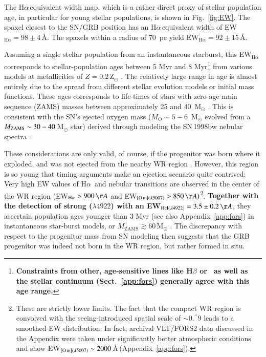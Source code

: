 \documentclass[traditabstract, referee]{aa}
\newcommand{\farc}{\hbox{$.\!\!^{\prime\prime}$}}
\newcommand{\ha}{H$\alpha$}
\newcommand{\hei}{\ion{He}{i}}
\newcommand{\oiii}{[\ion{O}{iii}]}
\begin{document}
The \ha\,equivalent width map, which is a rather direct proxy of stellar population age, in particular for young stellar populations, is shown in Fig.~\ref{fig:EW}. The spaxel closest to the SN/GRB position has an \ha\,equivalent width of EW$_{\mathrm{H\alpha}}=98\pm4$\,\AA. The spaxels within a radius of 70~pc yield EW$_{\mathrm{H\alpha}}=92\pm15$\,\AA. 

Assuming a single stellar population from an instantaneous starburst, this EW$_{\mathrm{H\alpha}}$ corresponds to stellar-population ages between 5 Myr and 8 Myr\footnote{\textbf{Constraints from other, age-sensitive lines like H$\beta$ or \hei\,\citep{1999ApJS..125..489G} as well as the stellar continuum (Sect.~\ref{app:fors}) generally agree with this age range.}} from various models at metallicities of $Z=0.2$\,Z$_{\odot}$ \citep[see e.g.][and references therein]{2013ApJ...779..170L, 2016arXiv160703446K}. The relatively large range in age is almost entirely due to the spread from different stellar evolution models or initial mass functions. These ages corresponds to life-times of stars with zero-age main sequence (ZAMS) masses between approximately 25 and 40~M$_{\odot}$ \citep{1994A&AS..105...29F, 2005A&A...429..581M}. This is consistent with the SN's ejected oxygen mass ($M_{\mathrm{O}}\sim5-6$~M$_{\odot}$ evolved from a $M_{\rm{ZAMS}} \sim 30-40$\,M$_{\odot}$ star) derived through modeling the SN\,1998bw nebular spectra \citep{2001ApJ...559.1047M, 2006ApJ...640..854M}.

These considerations are only valid, of course, if the progenitor was born where it exploded, and was not ejected from the nearby WR region \citep{2006A&A...454..103H}. However, this region is so young that timing arguments make an ejection scenario quite contrived: Very high EW values of \ha~and nebular transitions are observed in the center of the WR region (EW$_{\mathrm{H\alpha}}>900\,\AA$ and EW$_{\oiii(\lambda5007)}>850\,\AA)$\footnote{These are strictly lower limits. The fact that the compact WR region is convolved with the seeing-introduced spatial scale of $\sim$0\farc{9} leads to a smoothed EW distribution. In fact, archival VLT/FORS2 data discussed in the Appendix were taken under significantly better atmospheric conditions and show EW$_{\oiii(\lambda5007)}\sim2000$\,\AA\,(Appendix~\ref{app:fors}).}. \textbf{Together with the detection of strong \hei($\lambda4922$) with an EW$_{\mathrm{HeI(\lambda4922)}}=3.5\pm0.2\,\AA$}, they ascertain population ages younger than 3 Myr (see also Appendix~\ref{app:fors}) in instantaneous star-burst models, or $M_{\mathrm{ZAMS}} \gtrsim 60$\,M$_{\odot}$ \citep[see e.g.][and references therein for a similar case]{2015MNRAS.451L..65T}. The discrepancy with respect to the progenitor mass from SN modeling \citep[e.g.,][]{2001ApJ...559.1047M, 2006ApJ...640..854M} then suggests that the GRB progenitor was indeed not born in the WR region, but rather formed in situ.
\end{document}
